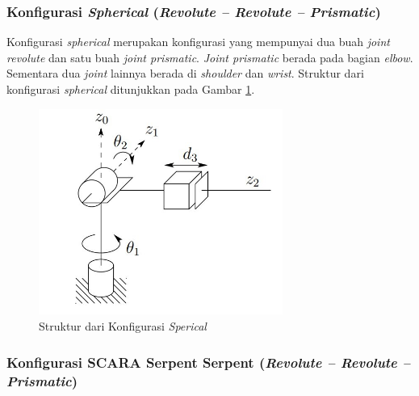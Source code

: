 \subsubsection{Konfigurasi \textit{Spherical} (\textit{Revolute – Revolute – Prismatic})} 

Konfigurasi \textit{spherical} merupakan konfigurasi yang mempunyai dua buah \textit{joint revolute} dan satu buah \textit{joint prismatic}. \textit{Joint prismatic} berada pada bagian \textit{elbow}. Sementara dua \textit{joint} lainnya berada di \textit{shoulder} dan \textit{wrist}. Struktur dari konfigurasi \textit{spherical} ditunjukkan pada Gambar \ref{pic.spherical}. 
\begin{figure}[H]
	\centering
	\includegraphics[width=8cm]{gambar/spherical.jpg}
	\caption{Struktur dari Konfigurasi \textit{Sperical}\cite{Spong2006}}
	\label{pic.spherical}
\end{figure}


\subsubsection{Konfigurasi SCARA Serpent Serpent (\textit{Revolute – Revolute – Prismatic}) } 

